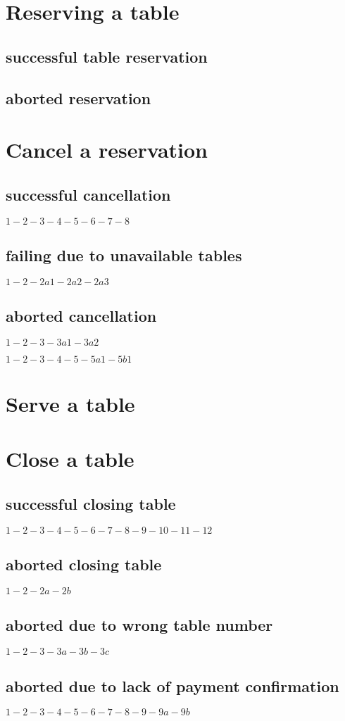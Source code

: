 \documentclass[a4paper,11pt,oneside]{book}
\begin{document}
\section{Reserving a table}

\subsection{successful table reservation}
\subsection{aborted reservation}

\section{Cancel a reservation}

\subsection{successful cancellation}
$1-2-3-4-5-6-7-8$
\subsection{failing due to unavailable tables}
$1-2-2a1-2a2-2a3$

\subsection{aborted cancellation}
$1-2-3-3a1-3a2$

\noindent$1-2-3-4-5-5a1-5b1$

\section{Serve a table}

\section{Close a table}

\subsection{successful closing table}
$1-2-3-4-5-6-7-8-9-10-11-12$

\subsection{aborted closing table}

$1-2-2a-2b$

\subsection{aborted due to wrong table number}

$1-2-3-3a-3b-3c$

\subsection{aborted due to lack of payment confirmation}

$1-2-3-4-5-6-7-8-9-9a-9b$
\end{document}
